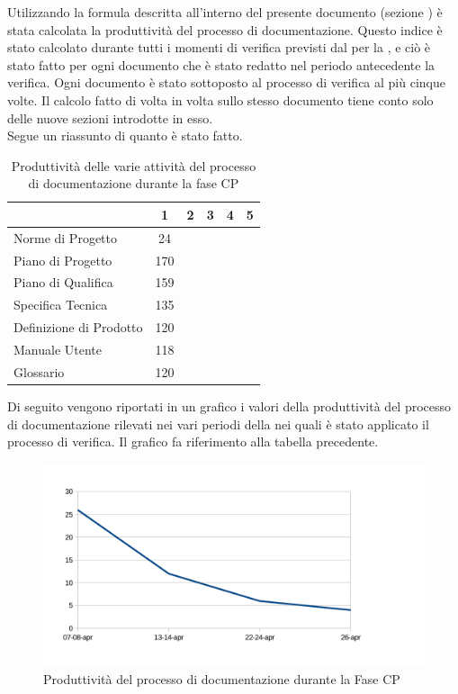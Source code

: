 Utilizzando la formula descritta all'interno del presente documento (sezione ) è stata calcolata la produttività del processo di documentazione. Questo indice è stato calcolato durante tutti i momenti di verifica previsti dal  per la , e ciò è stato fatto per ogni documento che è stato redatto nel periodo antecedente la verifica. Ogni documento è stato sottoposto al processo di verifica al più cinque volte. Il calcolo fatto di volta in volta sullo stesso documento tiene conto solo delle nuove sezioni introdotte in esso.\\
Segue un riassunto di quanto è stato fatto.
\begin{table}[H]
      \centering
		\begin{tabu}{| l | c | c | c | c | c |}
		\hline
		&1	&2	&3	&4	&5	\\ \hline
		Norme di Progetto	& 24 &	&	&	& \\ \hline
		Piano di Progetto	& 170 &	&	&	& \\ \hline
		Piano di Qualifica	& 159	&	&	&	&\\ \hline
		Specifica Tecnica & 135 & & & \\ \hline
		Definizione di Prodotto & 120 &	 	&	&  	&\\ \hline
		Manuale Utente & 118	&	&	&	& \\ \hline
		Glossario & 120 &  & & &\\ \hline
		\end{tabu}
		\caption{Produttività delle varie attività del processo di documentazione durante la fase CP}
\end{table}
Di seguito vengono riportati in un grafico i valori della produttività del processo di documentazione rilevati nei vari periodi della  nei quali è stato applicato il processo di verifica. Il grafico fa riferimento alla tabella precedente.\\
\begin{figure}[H]
	\centering
		\includegraphics[width=12cm]{PianoDiQualifica/Pics/ProduttivitaDocumentazioneFaseCP.pdf}
	\caption{Produttività del processo di documentazione durante la Fase CP}
\end{figure}
